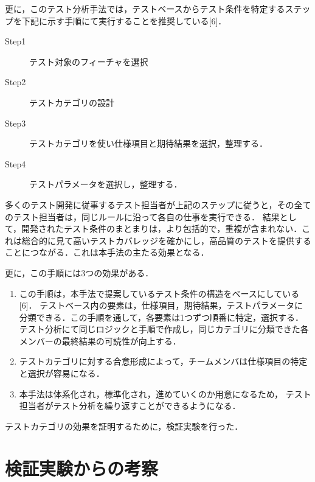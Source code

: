 \documentclass[a4paper,12pt]{jreport}
\begin{document}
更に，このテスト分析手法では，テストベースからテスト条件を特定するステップを下記に示す手順にて実行することを推奨している[6]．

\begin{description}
\item[Step1] テスト対象のフィーチャを選択
\item[Step2] テストカテゴリの設計
\item[Step3] テストカテゴリを使い仕様項目と期待結果を選択，整理する．
\item[Step4] テストパラメータを選択し，整理する．
\end{description}

多くのテスト開発に従事するテスト担当者が上記のステップに従うと，その全てのテスト担当者は，同じルールに沿って各自の仕事を実行できる． 結果として，開発されたテスト条件のまとまりは，より包括的で，重複が含まれない．これは総合的に見て高いテストカバレッジを確かにし，高品質のテストを提供することにつながる．これは本手法の主たる効果となる．

更に，この手順には3つの効果がある．
\begin{enumerate}
\item この手順は，本手法で提案しているテスト条件の構造をベースにしている [6]． テストベース内の要素は，仕様項目，期待結果，テストパラメータに分類できる．この手順を通して，各要素は1つずつ順番に特定，選択する． テスト分析にて同じロジックと手順で作成し，同じカテゴリに分類できた各メンバーの最終結果の可読性が向上する．
\item テストカテゴリに対する合意形成によって，チームメンバは仕様項目の特定と選択が容易になる．
\item 本手法は体系化され，標準化され，進めていくのか用意になるため， テスト担当者がテスト分析を繰り返すことができるようになる．
\end{enumerate}

テストカテゴリの効果を証明するために，検証実験を行った．

\section{検証実験からの考察}
\end{document}
